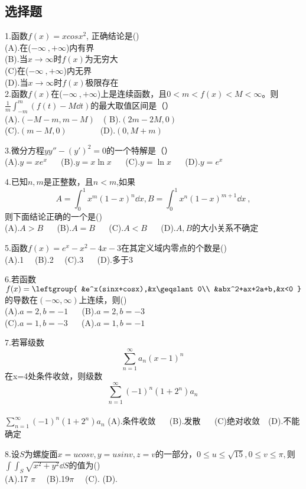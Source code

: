 
\begin{issues}
\issueDraft
\end{issues}


\subsection{选择题}
1.函数$f(x)=xcosx^2$, 正确结论是()\\
(A).在($-\infty~,+\infty$)内有界\\
(B).当$x\to\infty$时$f(x)$为无穷大\\
(C)在($-\infty~,+\infty$)内无界\\
(D).当$x\to\infty$时$f(x)$极限存在\\

2.函数$f(x)$在($-\infty~,+\infty$)上是连续函数，且$0<m<f(x)<M<\infty$。则
$ \frac{1}{m} \int_{-m}^{m}(f(t)-M \dd{t})$的最大取值区间是（）\\
(A).$(-M-m,m-M) \quad$( B).$ (2m-2M,0)$\\ (C).$(m-M,0)\qquad \qquad $(D).$(0,M+m)$

3.微分方程$y y''-(y')^2=0$的一个特解是（）\\
(A).$y=xe^x$ $\quad$ (B).$y=x\ln x$ $\quad$ (C).$y=\ln x$  $\quad$ (D).$y=e^x$

4.已知$n,m$是正整数，且$n<m$,如果
\begin{equation}
A=\int_{0}^{1} x^m(1-x)^n \dd{x},B=\int_{0}^{1}x^n(1-x)^{m+1} \dd{x}~,
\end{equation}则下面结论正确的一个是()\\
(A).$A>B$ $\quad$ (B).$A=B$ $\quad$ (C).$A<B$ $\quad$ (D).$A,B$的大小关系不确定

5.函数$f(x)=e^x-x^2-4x-3$在其定义域内零点的个数是()\\
(A).1 $\quad$(B).2 $\quad$(C).3 $\quad$ (D).多于3

6.若函数$f(x)=\leftgroup{
    &e^x(sinx+cosx),&x\geqslant0\\
    &abx^2+ax+2a+b,&x<0
    }$
    的导数在$(-\infty,\infty)$上连续，则()\\
    (A).$a=2,b=-1$   $\quad$  (B).$a=2,b=-3$   \\
    (C).$a=1,b=-3$   $\quad$   (A).$a=1,b=-1$   

7.若幂级数\begin{equation}
\sum_{n=1}^\infty a_n(x-1)^n ~
\end{equation}在x=4处条件收敛，则级数
\begin{equation}
\sum_{n=1}^\infty (-1)^n(1+2^n)a_n~
\end{equation}\\
$\displaystyle \sum_{n=1}^\infty (-1)^n(1+2^n)a_n $
(A).条件收敛 $\quad$ (B).发散 $\quad$ (C)绝对收敛$\quad$(D).不能确定

8.设$S$为螺旋面$x=ucosv,y=usinv,z=v$的一部分，$0\leqslant u \leqslant \sqrt{15},0 \leqslant v \leqslant \pi,$则$\int \int_{S} \sqrt{x^2+y^2} \dd{S}$的值为()\\
(A).17 $\pi \quad$ (B).19$ \pi \quad$ (C).  (D).